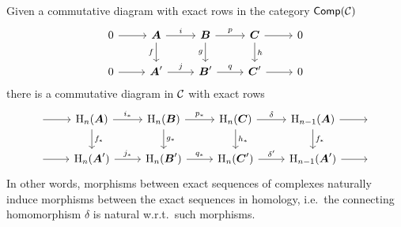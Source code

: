 \begin{prop}\label{naturality of connecting hom}
    Given a commutative diagram with exact rows in the category $\mathsf{Comp}(\mathcal{C})$
    \[\begin{tikzcd}
        0\arrow[r] & \bm{A}\arrow[r,"i"]\arrow[d,swap,"f"] & \bm{B} \arrow[r,"p"]\arrow[d,swap,"g"] & \bm{C}\arrow[d,"h"]\arrow[r] & 0 \\
       0\arrow[r] & \bm{A}'\arrow[r,"j"] & \bm{B}'\arrow[r,"q"] &\bm{C}' \arrow[r] &0
    \end{tikzcd}\]
    there is a commutative diagram in $\mathcal{C}$ with exact rows
    \[\begin{tikzcd}
        ~\arrow[r]& \rmH_n(\bm{A})\arrow[r,"i_\ast"]\arrow[d,"f_\ast"] & \rmH_n(\bm{B}) \arrow[r,"p_\ast"]\arrow[d,"g_\ast"] & \rmH_n(\bm{C})\arrow[d,"h_\ast"]\arrow[r,"\delta"] & \rmH_{n-1}(\bm{A})\arrow[d,"f_\ast"]\arrow[r]&~ \\
       ~\arrow[r] & \rmH_n(\bm{A}')\arrow[r,"j_\ast"] & \rmH_n(\bm{B}')\arrow[r,"q_\ast"] &\rmH_n(\bm{C}') \arrow[r,"\delta'"] &\rmH_{n-1}(\bm{A}')\arrow[r]&~ 
    \end{tikzcd}\]
    In other words, morphisms between exact sequences of complexes naturally induce morphisms between the exact sequences in homology, i.e.\ the connecting homomorphism $\delta$ is natural w.r.t.\ such morphisms.
\end{prop}
